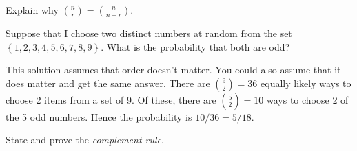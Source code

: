 \documentclass[addpoints,12pt]{exam}
\begin{document}
\begin{questions}

\question Explain why $\displaystyle{n \choose r} = {n \choose n-r}$.


  \question Suppose that I choose two distinct numbers at random from the set $\left\{ 1, 2, 3, 4, 5, 6, 7, 8, 9 \right\}$. What is the probability that both are odd?
  \begin{solution}
    This solution assumes that order doesn't matter.
    You could also assume that it does matter and get the same answer.
    There are $\displaystyle {9 \choose 2} = 36$ equally likely ways to choose 2 items from a set of 9. Of these, there are $\displaystyle {5 \choose 2} = 10$ ways to choose 2 of the 5 odd numbers.
    Hence the probability is $10/36 = 5/18$.
  \end{solution}


\question State and prove the \emph{complement rule}.


\end{questions}
\end{document}
